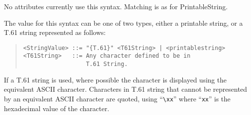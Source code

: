 No attributes currently use this syntax.
Matching is as for PrintableString.

\label{T61String}
The value for this syntax can be one of two types, either a printable
string, or a T.61 string represented as follows:
\begin{quote}\begin{verbatim}
<StringValue> ::= "{T.61}" <T61String> | <printablestring>
<T61String>   ::= Any character defined to be in 
                  T.61 String.
\end{verbatim}\end{quote}

If a T.61 string is used, where possible the character is displayed
using the equivalent ASCII character.
Characters in T.61 string that cannot be represented by an
equivalent ASCII character are quoted, using ``\verb+\xx+'' where
``\verb+xx+'' is the hexadecimal value of the character.

